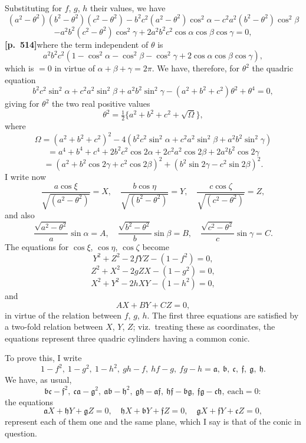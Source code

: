 \documentclass[11pt,a4paper]{article}
\begin{document}
Substituting for $f$, $g$, $h$ their values, we have
\[
(a^{2} - \theta^{2})(b^{2} - \theta^{2})(c^{2} - \theta^{2}) - b^{2}c^{2}(a^{2} - \theta^{2})\cos^{2}\alpha - c^{2}a^{2}(b^{2} - \theta^{2})\cos^{2}\beta
\]
\[
- a^{2}b^{2}(c^{2} - \theta^{2})\cos^{2}\gamma + 2a^{2}b^{2}c^{2}\cos\alpha\cos\beta\cos\gamma = 0,
\]
\noindent\textbf{[p.~514]}\quad where the term independent of $\theta$ is
\[
a^{2}b^{2}c^{2}(1 - \cos^{2}\alpha - \cos^{2}\beta - \cos^{2}\gamma + 2\cos\alpha\cos\beta\cos\gamma),
\]
which is $= 0$ in virtue of $\alpha + \beta + \gamma = 2\pi$. We have, therefore, for $\theta^{2}$ the quadric equation
\[
b^{2}c^{2}\sin^{2}\alpha + c^{2}a^{2}\sin^{2}\beta + a^{2}b^{2}\sin^{2}\gamma - (a^{2} + b^{2} + c^{2})\theta^{2} + \theta^{4} = 0,
\]
giving for $\theta^{2}$ the two real positive values
\[
\theta^{2} = \tfrac{1}{2}\{a^{2} + b^{2} + c^{2} + \sqrt{\Omega}\},
\]
where
\[
\Omega = (a^{2} + b^{2} + c^{2})^{2} - 4(b^{2}c^{2}\sin^{2}\alpha + c^{2}a^{2}\sin^{2}\beta + a^{2}b^{2}\sin^{2}\gamma)
\]
\[
= a^{4} + b^{4} + c^{4} + 2b^{2}c^{2}\cos 2\alpha + 2c^{2}a^{2}\cos 2\beta + 2a^{2}b^{2}\cos 2\gamma
\]
\[
= (a^{2} + b^{2}\cos 2\gamma + c^{2}\cos 2\beta)^{2} + (b^{2}\sin 2\gamma - c^{2}\sin 2\beta)^{2}.
\]
I write now
\[
\frac{a\cos\xi}{\sqrt{(a^{2} - \theta^{2})}} = X,\quad \frac{b\cos\eta}{\sqrt{(b^{2} - \theta^{2})}} = Y,\quad \frac{c\cos\zeta}{\sqrt{(c^{2} - \theta^{2})}} = Z,
\]
and also
\[
\frac{\sqrt{a^{2} - \theta^{2}}}{a}\sin\alpha = A,\quad \frac{\sqrt{b^{2} - \theta^{2}}}{b}\sin\beta = B,\quad \frac{\sqrt{c^{2} - \theta^{2}}}{c}\sin\gamma = C.
\]
The equations for $\cos\xi$, $\cos\eta$, $\cos\zeta$ become
\[
Y^{2} + Z^{2} - 2fYZ - (1 - f^{2}) = 0,
\]
\[
Z^{2} + X^{2} - 2gZX - (1 - g^{2}) = 0,
\]
\[
X^{2} + Y^{2} - 2hXY - (1 - h^{2}) = 0,
\]
and
\[
AX + BY + CZ = 0,
\]
in virtue of the relation between $f$, $g$, $h$. The first three equations are satisfied by a two-fold relation between $X$, $Y$, $Z$; viz.\ treating these as coordinates, the equations represent three quadric cylinders having a common conic.

To prove this, I write
\[
1 - f^{2},\ 1 - g^{2},\ 1 - h^{2},\ gh - f,\ hf - g,\ fg - h = \mathfrak{a},\ \mathfrak{b},\ \mathfrak{c},\ \mathfrak{f},\ \mathfrak{g},\ \mathfrak{h}.
\]
We have, as usual,
\[
\mathfrak{b}\mathfrak{c} - \mathfrak{f}^{2},\ \mathfrak{c}\mathfrak{a} - \mathfrak{g}^{2},\ \mathfrak{a}\mathfrak{b} - \mathfrak{h}^{2},\ \mathfrak{g}\mathfrak{h} - \mathfrak{a}\mathfrak{f},\ \mathfrak{h}\mathfrak{f} - \mathfrak{b}\mathfrak{g},\ \mathfrak{f}\mathfrak{g} - \mathfrak{c}\mathfrak{h},\ \text{each} = 0:
\]
the equations
\[
\mathfrak{a}X + \mathfrak{h}Y + \mathfrak{g}Z = 0,\quad \mathfrak{h}X + \mathfrak{b}Y + \mathfrak{f}Z = 0,\quad \mathfrak{g}X + \mathfrak{f}Y + \mathfrak{c}Z = 0,
\]
represent each of them one and the same plane, which I say is that of the conic in question.
\end{document}
